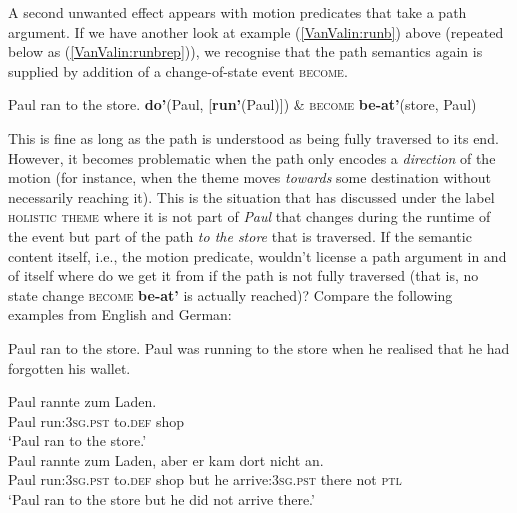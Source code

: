 A second unwanted effect appears with motion predicates that take a path argument. If we have another look at example (\ref{VanValin:runb}) above (repeated below as (\ref{VanValin:runbrep})), we recognise that the path semantics again is supplied by addition of a change-of-state event \textsc{become}. 

\ea \label{VanValin:runbrep}
\ea Paul ran to the store. 
\ex \textbf{do'}(Paul, [\textbf{run'}(Paul)]) \& \textsc{become} \textbf{be-at'}(store, Paul)
\z
\z

This is fine as long as the path is understood as being fully traversed to its end. However, it becomes problematic when the path only encodes a \emph{direction} of the motion (for instance, when the theme moves \textit{towards} some destination without necessarily reaching it). This is the situation that \citet[569]{dowty1991thematic} has discussed under the label \textsc{holistic theme} where it is not part of \textit{Paul} that changes during the runtime of the event but part of the path \textit{to the store} that is traversed. If the semantic content itself, i.e., the motion predicate, wouldn't license a path argument in and of itself where do we get it from if the path is not fully traversed (that is, no state change \textsc{become} \textbf{be-at'} is actually reached)?  Compare the following examples from English and German:

\ea
\ea Paul ran to the store.\label{runstorea}
\ex Paul was running to the store when he realised that he had forgotten his wallet.\label{runstoreb}
\z
\z

\ea 
\ea \label{runstoreag}
\gll Paul rannte zum Laden.\\
Paul run:\textsc{3}\textsc{sg}.\textsc{pst} to.\textsc{def} shop \\
\glft `Paul ran to the store.'\\
\ex \label{runstorebg}
\gll Paul rannte zum Laden, aber er kam dort nicht an.\\
Paul run:\textsc{3}\textsc{sg}.\textsc{pst} to.\textsc{def} shop but he arrive:\textsc{3}\textsc{sg}.\textsc{pst} there not \textsc{ptl} \\
\glft `Paul ran to the store but he did not arrive there.'\\
\z
\z

